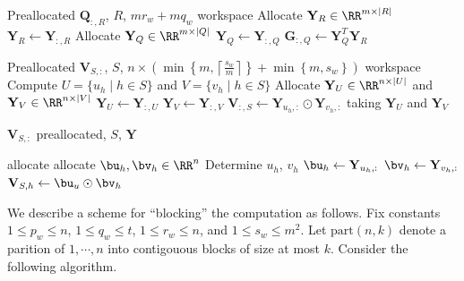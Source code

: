 \documentclass{article}
\newcommand{\bG}{\mathbf{G}}
\newcommand{\bQ}{\mathbf{Q}}
\newcommand{\bV}{\mathbf{V}}
\newcommand{\bY}{\mathbf{Y}}
\begin{document}
\begin{algorithm}
\caption{Compute $\bQ_{:,R}$}\label{alg2}
\begin{algorithmic}
    \REQUIRE Preallocated $\bQ_{:,R}$, $R$, $mr_w + mq_w$ workspace
    \STATE Allocate $\bY_R \in \RR^{m \times |R|}$
    \STATE $\bY_R \gets \bY_{:,R}$
        \STATE Allocate $\bY_Q \in \RR^{m \times |Q|}$
        \STATE $\bY_Q \gets \bY_{:,Q}$
        \STATE $\bG_{:,Q} \gets \bY_Q^T\bY_R$
    \ENDFOR
\end{algorithmic}
\end{algorithm}

\begin{algorithm}
\caption{Compute $\bV_{S,:}$}\label{alg3}
\begin{algorithmic}
    \REQUIRE Preallocated $\bV_{S,:}$, $S$, $n \times \left(\min\left\{m, \left\lceil \frac{s_w}{m} \right  \rceil\right\} + \min\left\{m, s_w\right\}\right)$ workspace
    \STATE Compute $U = \{u_h\;|\; h \in S\}$ and $V = \{v_h\;|\; h \in S\}$
    \STATE Allocate $\bY_U \in \RR^{n \times |U|}$ and $\bY_V \in \RR^{n \times |V|}$
    \STATE $\bY_U \gets \bY_{:,U}$
    \STATE $\bY_V \gets \bY_{:,V}$
        \STATE $\bV_{:,S} \gets \bY_{u_h,:} \odot \bY_{v_h,:}$ taking $\bY_U$ and $\bY_V$
    \ENDFOR
\end{algorithmic}
\end{algorithm}



\quad

\newpage

\begin{algorithmic}
\REQUIRE $\bV_{S,:}$ preallocated, $S$, $\bY$

\;
\STATE allocate 
\STATE allocate $\bu_h,\bv_h \in \RR^n$
\STATE Determine $u_h$, $v_h$
\STATE $\bu_h \gets \bY_{u_h,:}$
\STATE $\bv_h \gets \bY_{v_h,:}$
\STATE $\bV_{S,h} \gets \bu_u \odot \bv_h$
\ENDFOR
\end{algorithmic}

We describe a scheme for ``blocking'' the computation as follows. Fix constants $1 \leq p_w \leq n$, $1 \leq q_w \leq t$, $1 \leq r_w \leq n$, and $1 \leq s_w \leq m^2$. Let $\text{part}(n, k)$ denote a parition of $1, \cdots, n$ into contigouous blocks of size at most $k$. Consider the following algorithm.
\end{document}
